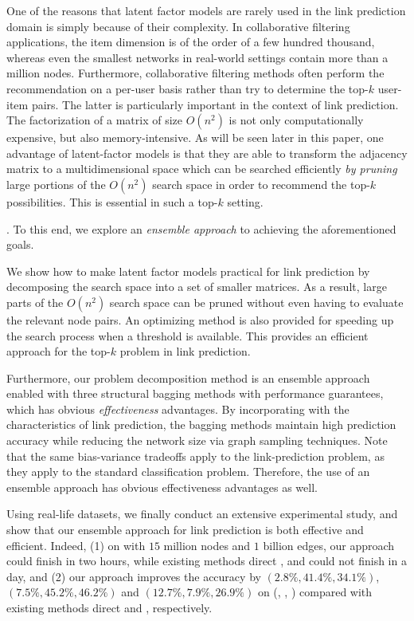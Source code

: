 One of the reasons that latent factor models are rarely used in the
link prediction domain is simply because of their complexity. In
collaborative filtering applications, the item dimension is of the
order of a few hundred thousand, whereas even the smallest networks
in real-world settings contain more than a million nodes.
Furthermore, collaborative filtering methods  often perform the
recommendation on a per-user basis rather than try to determine
the top-$k$ user-item pairs.  The latter is particularly important
in the context of link prediction. The factorization of a matrix of
size $O(n^2)$ is not only computationally expensive, but also
memory-intensive.  As will be seen later in this paper, one advantage
of  latent-factor models is that they are able to  transform the
adjacency matrix to a multidimensional space which can be searched
efficiently {\em by pruning} large portions of the $O(n^2)$ search
space in order to recommend the top-$k$ possibilities.
This is essential in such a top-$k$ setting.

. To this end, we explore an {\em ensemble approach} to
achieving the aforementioned goals.

We show how to make latent factor models
practical for link prediction by decomposing the search space into a
 set of smaller matrices. As a result, large parts of the $O(n^2)$
search space can be pruned without even having to evaluate the
relevant node pairs. An optimizing method is also provided for
speeding up the search process when a threshold is available.
This provides an efficient approach for the
top-$k$ problem in link prediction.  

Furthermore, our problem
decomposition method is an ensemble approach enabled with three
structural bagging methods with performance guarantees, which has obvious {\em
effectiveness} advantages. By incorporating with the characteristics of  link prediction, the bagging methods maintain high prediction
accuracy while reducing the network size via graph sampling techniques. 
Note that the same bias-variance
tradeoffs apply to the link-prediction problem, as they apply to the
standard classification problem. Therefore, the use of an ensemble
approach has obvious effectiveness advantages as well.

Using real-life datasets, we finally conduct an extensive experimental study, and show that our ensemble approach for link prediction is both effective and efficient. Indeed, (1) on \Friendster with $15$ million nodes and $1$ billion edges, our approach could finish in
two hours, while existing methods direct \NMF, \Aa \cite{adamic} and \BIGCLAM \cite{yang-wsdm2013} could not finish in a day, and
(2) our approach improves the accuracy by $(2.8\%, 41.4\%, 34.1\%)$, $(7.5\%, 45.2\%, 46.2\%)$ and $(12.7\%, 7.9\%, 26.9\%)$ on (\Digg, \YouTube, \Wikipedia)
compared with existing methods  direct \NMF \Aa and \BIGCLAM, respectively.


